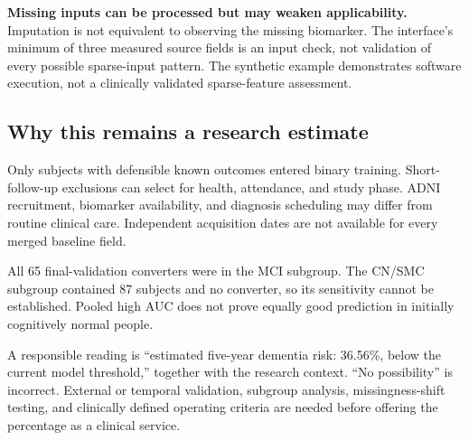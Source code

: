 \textbf{Missing inputs can be processed but may weaken applicability.} Imputation is not equivalent to observing the missing biomarker. The interface's minimum of three measured source fields is an input check, not validation of every possible sparse-input pattern. The synthetic example demonstrates software execution, not a clinically validated sparse-feature assessment.

\subsection{Why this remains a research estimate}
Only subjects with defensible known outcomes entered binary training. Short-follow-up exclusions can select for health, attendance, and study phase. ADNI recruitment, biomarker availability, and diagnosis scheduling may differ from routine clinical care. Independent acquisition dates are not available for every merged baseline field.

All 65 final-validation converters were in the MCI subgroup. The CN/SMC subgroup contained 87 subjects and no converter, so its sensitivity cannot be established. Pooled high AUC does not prove equally good prediction in initially cognitively normal people.

A responsible reading is ``estimated five-year dementia risk: 36.56\%, below the current model threshold,'' together with the research context. ``No possibility'' is incorrect. External or temporal validation, subgroup analysis, missingness-shift testing, and clinically defined operating criteria are needed before offering the percentage as a clinical service.
\clearpage

